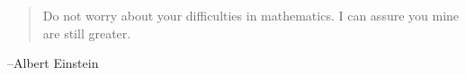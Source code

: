 \documentclass[letterpaper]{exam}
\begin{document}
  \else
    \vspace{11 cm}
    \begin{quote}
      \begin{em}
         Do not worry about your difficulties in mathematics. I can assure you
         mine are still greater.
      \end{em}
    \end{quote}
    \hspace{1 cm} --Albert Einstein
  \fi
\end{document}
